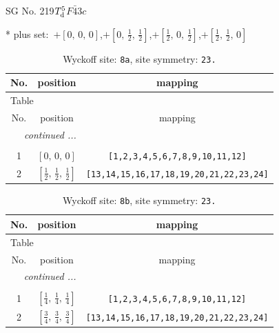 \documentclass[fleqn,8pt]{jsarticle}
\begin{document}
\setcounter{MaxMatrixCols}{32}

\renewcommand{\tablename}{Table~}
\renewcommand{\figurename}{Figure~}
\begin{center}
\LARGE
SG No. 219\quad$T_{\rm d}^{5}$\quad$F\bar{4}3c$\quad[ cubic ]
\end{center}
* plus set:\,\,\,$+\left[ 0,\, 0,\, 0 \right]$,\quad $+\left[ 0,\, \frac{1}{2},\, \frac{1}{2} \right]$,\quad $+\left[ \frac{1}{2},\, 0,\, \frac{1}{2} \right]$,\quad $+\left[ \frac{1}{2},\, \frac{1}{2},\, 0 \right]$
\renewcommand{\arraystretch}{1.2}
\begin{longtable}{ccc}
\caption{Wyckoff site: {\tt 8a}, site symmetry: {\tt 23.}}
 \\
 \hline \hline
No. & position & mapping \\ \hline \endfirsthead

\multicolumn{2}{l}{\tablename\ \thetable{}} \\
 \hline \hline
No. & position & mapping \\ \hline \endhead

 \hline \hline
\multicolumn{2}{r}{\footnotesize\it continued ...} \\ \endfoot

 \hline \hline
\multicolumn{2}{r}{} \\ \endlastfoot

1 & $\left[ 0,\, 0,\, 0 \right]$ & {\tt [1,2,3,4,5,6,7,8,9,10,11,12]} \\ \hline
2 & $\left[ \frac{1}{2},\, \frac{1}{2},\, \frac{1}{2} \right]$ & {\tt [13,14,15,16,17,18,19,20,21,22,23,24]} \\
\end{longtable}
\renewcommand{\arraystretch}{1.2}
\begin{longtable}{ccc}
\caption{Wyckoff site: {\tt 8b}, site symmetry: {\tt 23.}}
 \\
 \hline \hline
No. & position & mapping \\ \hline \endfirsthead

\multicolumn{2}{l}{\tablename\ \thetable{}} \\
 \hline \hline
No. & position & mapping \\ \hline \endhead

 \hline \hline
\multicolumn{2}{r}{\footnotesize\it continued ...} \\ \endfoot

 \hline \hline
\multicolumn{2}{r}{} \\ \endlastfoot

1 & $\left[ \frac{1}{4},\, \frac{1}{4},\, \frac{1}{4} \right]$ & {\tt [1,2,3,4,5,6,7,8,9,10,11,12]} \\ \hline
2 & $\left[ \frac{3}{4},\, \frac{3}{4},\, \frac{3}{4} \right]$ & {\tt [13,14,15,16,17,18,19,20,21,22,23,24]} \\
\end{longtable}
\end{document}
